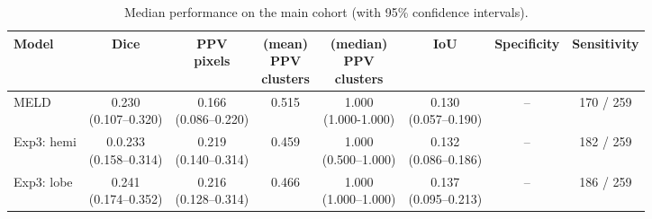 \documentclass[a4paper,12pt]{article}
\begin{document}
\begin{table}[ht]
\tiny
\begin{threeparttable}
\centering
\caption{Median performance on the main cohort (with 95\% confidence intervals).} 
\label{tab:independent_cohort}
\begin{tabular}{lccccccc}
\textbf{Model} &
\textbf{Dice} &
\makecell{\textbf{PPV}\\\textbf{pixels}} &
\makecell{\textbf{(mean)} \\\textbf{PPV}\\\textbf{clusters}} & \makecell{\textbf{(median)}\\\textbf{PPV}\\\textbf{clusters}} & 
\textbf{IoU} & 
\textbf{Specificity} &
\textbf{Sensitivity} \\
\midrule
MELD &
\makecell{0.230\\(0.107--0.320)} &
\makecell{0.166\\(0.086--0.220)} &
\colorbox{green!20}{0.515} &
\makecell{1.000 \\ (1.000-1.000)} &
\makecell{0.130\\(0.057--0.190)} &
-- & %
170 / 259 \\

Exp3: hemi  &
\makecell{0.0.233\\(0.158--0.314)} &
\makecell{0.219\\(0.140--0.314)} &
\colorbox{blue!20}{0.459} &
\makecell{1.000\\(0.500--1.000)} &
\makecell{0.132\\(0.086--0.186)} &
-- &
182 / 259 \\

Exp3: lobe  &
\makecell{\colorbox{orange!20}{0.241}\\(0.174--0.352)} &
\makecell{0.216\\(0.128--0.314)} &
0.466 &
\makecell{1.000\\(1.000--1.000)} &
\makecell{\colorbox{orange!20}{0.137}\\(0.095--0.213)} &
-- & 
\colorbox{blue!20}{186 / 259} \\



\end{tabular}
\end{threeparttable}
\end{table}
\end{document}
